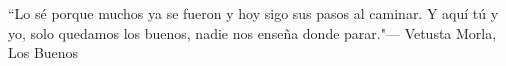
\setlength{\epigraphwidth}{.6\textwidth}
\begin{epigraphs}\setlength{\itemsep}{4cm}
\item{``Lo s\'{e} porque muchos ya se fueron y hoy sigo sus pasos al caminar. Y aqu\'{i} t\'{u} y yo, solo quedamos los buenos, nadie nos ense\~{n}a donde parar."}{--- \textup{Vetusta Morla}, Los Buenos}
\end{epigraphs}
